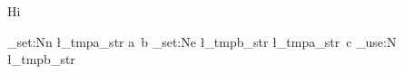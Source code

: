 \documentclass{article}
\begin{document}
Hi 

\ExplSyntaxOn
\str_set:Nn \l_tmpa_str {a~b}
\str_set:Ne \l_tmpb_str {\l_tmpa_str\ c}
\str_use:N \l_tmpb_str
\ExplSyntaxOff
\end{document}
